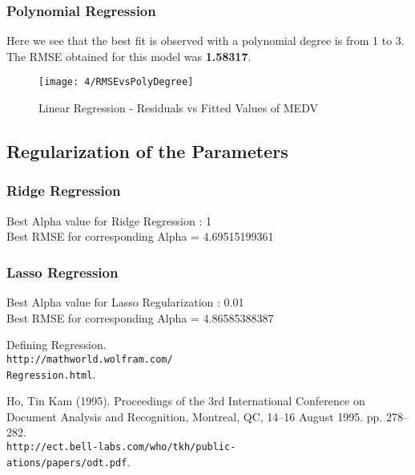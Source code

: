 \documentclass[letterpaper,twocolumn,10pt]{article}
\begin{document}
 \subsubsection{Polynomial Regression}
 Here we see that the best fit is observed with a polynomial degree is from 1 to 3. The RMSE obtained for this model was \textbf{1.58317}.

 \begin{figure}[H]
  \texttt{[image: 4/RMSEvsPolyDegree]}
  \caption{Linear Regression - Residuals vs Fitted Values of MEDV}
  \label{ResFitHouse}
 \end{figure}

\subsection{Regularization of the Parameters}
\subsubsection{Ridge Regression}
Best Alpha value for Ridge Regression : 1\\
Best RMSE for corresponding Alpha = 4.69515199361

\subsubsection{Lasso Regression}
Best Alpha value for Lasso Regularization : 0.01\\
Best RMSE for corresponding Alpha = 4.86585388387

\begin{thebibliography}{1}

 Defining Regression.\\ \texttt{http://mathworld.wolfram.com/\\Regression.html}.

 Ho, Tin Kam (1995). Proceedings of the 3rd International Conference on Document Analysis and Recognition, Montreal, QC, 14–16 August 1995. pp. 278–282.
\\\texttt{http://ect.bell-labs.com/who/tkh/public-\\ations/papers/odt.pdf}.

\end{thebibliography}
\end{document}
